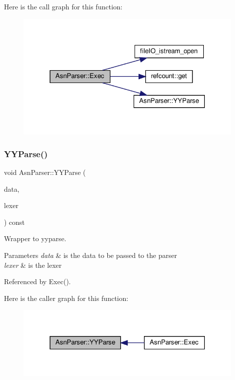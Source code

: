 Here is the call graph for this function\+:
\nopagebreak
\begin{figure}[H]
\begin{center}
\leavevmode
\includegraphics[width=314pt]{d7/dcb/classAsnParser_abdbeaeae6fefdb8081b3705d0a081d6f_cgraph}
\end{center}
\end{figure}
\mbox{\label{classAsnParser_ae5673a36c028dcc21e0c049b860d6b7f}} 
\subsubsection{\texorpdfstring{Y\+Y\+Parse()}{YYParse()}}
{\footnotesize\ttfamily void Asn\+Parser\+::\+Y\+Y\+Parse (\begin{DoxyParamCaption}\item[{const \hyperlink{asn__parser_8hpp_a4415115f21768df96deec09706ef283e}{Asn\+Parser\+Data\+Ref}}]{data,  }\item[{const \hyperlink{asn__lexer_8hpp_a1d453dc3c28f3d6586ede8e92677ea3e}{Asn\+Flex\+Lexer\+Ref}}]{lexer }\end{DoxyParamCaption}) const\hspace{0.3cm}{\ttfamily [protected]}}



Wrapper to yyparse. 


\begin{DoxyParams}{Parameters}
{\em data} & is the data to be passed to the parser \\
\hline
{\em lexer} & is the lexer \\
\hline
\end{DoxyParams}


Referenced by Exec().

Here is the caller graph for this function\+:
\nopagebreak
\begin{figure}[H]
\begin{center}
\leavevmode
\includegraphics[width=314pt]{d7/dcb/classAsnParser_ae5673a36c028dcc21e0c049b860d6b7f_icgraph}
\end{center}
\end{figure}


